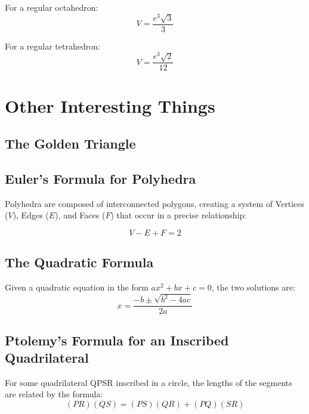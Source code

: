 \documentclass[draft, letterpaper, 12pt]{article}
\begin{document}
		For a regular octahedron:
		\begin{equation}
			V = \frac{e^3\sqrt{3}}{3}
		\end{equation}
		
		For a regular tetrahedron:
		\begin{equation}
			V = \frac{e^3\sqrt{2}}{12}
		\end{equation}
\section{Other Interesting Things}
	\subsection{The Golden Triangle}\label{sec: 36-72-72 triangle and value of phi}
	\subsection{Euler's Formula for Polyhedra}\label{sec: a relationship between vertices, edges, and faces in polyhedra}
		Polyhedra are composed of interconnected polygons, creating a system of Vertices ($V$), Edges ($E$), and Faces ($F$) that occur in a precise relationship:
		
		\begin{equation}
			V-E+F = 2
		\end{equation}
	\subsection{The Quadratic Formula}\label{sec: one of the most commonly used things in math team}
		Given a quadratic equation in the form $ax^2+bx+c = 0$, the two solutions are:
		\begin{equation}
			x = \frac{-b\pm \sqrt{b^2-4ac}}{2a}
		\end{equation}
	\subsection{Ptolemy's Formula for an Inscribed Quadrilateral}\label{sec: formula relating the distances between the vertices of an inscribed quadrilateral}
		For some quadrilateral QPSR inscribed in a circle, the lengths of the segments are related by the formula:
		\begin{equation}
			(PR)(QS) = (PS)(QR) + (PQ)(SR)
		\end{equation}
\end{document}
